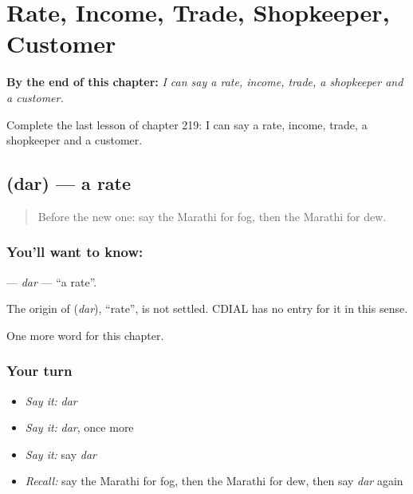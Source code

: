 
\chapter{Rate, Income, Trade, Shopkeeper, Customer}
\label{ch:mr-rate-income-trade-shopkeeper-customer}

\begin{chapteropening}
\textbf{By the end of this chapter:} \emph{I can say a rate, income, trade, a shopkeeper and a customer.}

Complete the last lesson of chapter 219: I can say a rate, income, trade, a shopkeeper and a customer.
\end{chapteropening}

\section[\texorpdfstring{\mr{दर} (dar)}{दर (dar)}]{ (dar) — a rate}

\label{lesson:MR-C219-dar}



\begin{quote}
Before the new one: say the Marathi for fog, then the Marathi for dew.
\end{quote}

\subsection*{You'll want to know: }
\textbf{} — \emph{dar} — \textquotedblleft{}a rate\textquotedblright{}.

\begin{cousinweb}
The origin of \textbf{} (\emph{dar}), \textquotedblleft{}rate\textquotedblright{}, is not settled. CDIAL has no entry for it in this sense.
\end{cousinweb}

\begin{grammarlens}[title={What you've built}]
One more word for this chapter.
\end{grammarlens}

\subsection*{Your turn}
\begin{itemize}
\raggedright
  \item \emph{Say it:} \emph{dar}
  \item \emph{Say it:} \emph{dar}, once more
  \item \emph{Say it:} say \emph{dar}
  \item \emph{Recall:} say the Marathi for fog, then the Marathi for dew, then say \emph{dar} again
\end{itemize}

